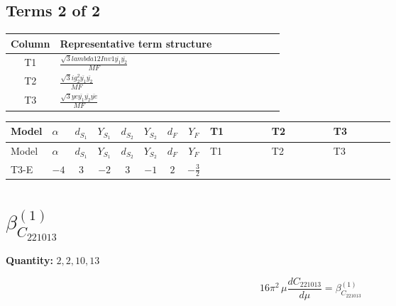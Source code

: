 \documentclass[8pt]{article}
\begin{document}
\begin{landscape}
\subsection*{Terms 2 of 2}
\begin{center}
\begin{tabular}{@{}c >{\raggedright\arraybackslash}p{0.82\linewidth}@{}}
\toprule
Column & Representative term structure \\
\midrule
T1 & \(\displaystyle \frac{\sqrt{3} lambda12Inv1 \overline{y_{1}} \overline{y_{2}}}{MF}\) \\
\midrule
T2 & \(\displaystyle \frac{\sqrt{3} i g_{2}^{2} \overline{y_{1}} \overline{y_{2}}}{MF}\) \\
\midrule
T3 & \(\displaystyle \frac{\sqrt{3} ye \overline{y_{1}} \overline{y_{2}} \overline{ye}}{MF}\) \\
\midrule
\bottomrule
\end{tabular}
\end{center}
\smallskip
\tiny
\begin{longtable}{@{}llcccccc >{\raggedright\arraybackslash}p{0.21\linewidth} >{\raggedright\arraybackslash}p{0.21\linewidth} >{\raggedright\arraybackslash}p{0.21\linewidth}@{}}
\toprule
Model & $\alpha$ & $d_{S_1}$ & $Y_{S_1}$ & $d_{S_2}$ & $Y_{S_2}$ & $d_F$ & $Y_F$ & T1 & T2 & T3 \\
\midrule
\endfirsthead
\toprule
Model & $\alpha$ & $d_{S_1}$ & $Y_{S_1}$ & $d_{S_2}$ & $Y_{S_2}$ & $d_F$ & $Y_F$ & T1 & T2 & T3 \\
\midrule
\endhead
T3-E & $-4$ & $3$ & $-2$ & $3$ & $-1$ & $2$ & $-\frac{3}{2}$ & \scriptsize\adjustbox{max width=\linewidth}{$\begin{gathered} \frac{\sqrt{3} lambda12Inv1 \overline{y_{1}} \overline{y_{2}}}{6 MF}\end{gathered}$} & \scriptsize\adjustbox{max width=\linewidth}{$\begin{gathered} - \frac{\sqrt{3} i g_{2}^{2} \overline{y_{1}} \overline{y_{2}}}{6 MF}\end{gathered}$} & \scriptsize\adjustbox{max width=\linewidth}{$\begin{gathered} \frac{\sqrt{3} ye \overline{y_{1}} \overline{y_{2}} \overline{ye}}{12 MF}\end{gathered}$} \\
\midrule
\bottomrule
\end{longtable}
\clearpage
\section*{$\beta_{C_{221013}}^{(1)}$}
\noindent\textbf{Quantity: }$\mathrm{2,2,10,13}$\par\smallskip
\[16\pi^2\,\mu\frac{d C_{221013}}{d\mu}=\beta_{C_{221013}}^{(1)}\]

\end{landscape}
\end{document}
